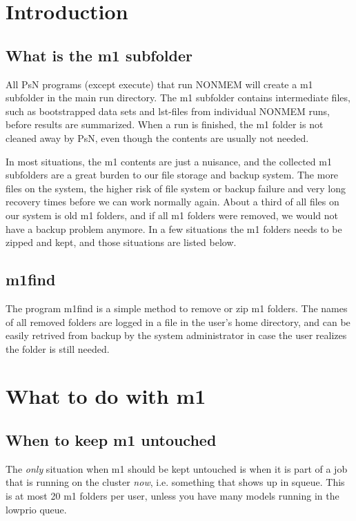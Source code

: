 \documentclass[a4wide,12pt]{article}
\date{#1}
\title{#1\\ }
\date{Revised #2}
\title{#1}
\date{#2}
\renewcommand{\_}{\textscale{.7}{\textunderscore}}
\begin{document}
\maketitle
\newcommand{\guidetoolname}{m1find}


\section{Introduction}
\subsection{What is the m1 subfolder}
All PsN programs (except execute) that run NONMEM will create a m1 subfolder in
the main run directory. The m1 subfolder contains intermediate files,
such as bootstrapped data sets and lst-files from individual NONMEM runs, before
results are summarized. When a run is finished, the m1 folder is not cleaned
away by PsN, even though the contents are usually not needed.

In most situations,
the m1 contents are just a nuisance, and the collected m1 subfolders
are a great burden to our file storage and backup system. The more files on
the system, the higher risk of file system or backup failure
and very long recovery times before we can work normally again.
About a third of all files on our system is old m1 folders, 
and if all
m1 folders were removed, we would not have a backup problem anymore.
In a few situations the m1 folders needs to be zipped and kept,
and those situations
are listed below.

\subsection{m1find}
The program m1find is a simple method to remove or zip m1 folders. 
The names of all removed folders are logged in a file in the user's home directory,
and can be easily retrived from backup by the system administrator in case the
user realizes the folder is still needed.

\section{What to do with m1}
\subsection{When to keep m1 untouched}
The \emph{only} situation when m1 should be kept untouched is when it is part of a job that
is running on the cluster \emph{now}, i.e. something that shows
up in squeue. This is at most 20 m1 folders per user, unless you have many
models running in the lowprio queue.
\end{document}
